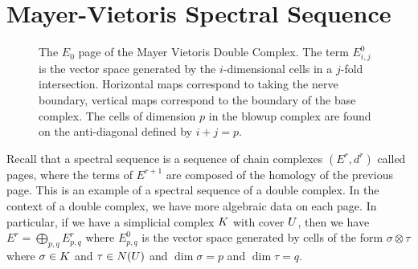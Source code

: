 \section{Mayer-Vietoris Spectral Sequence}
\begin{figure}[h]
\centering
{}
\caption{The $E_0$ page of the Mayer Vietoris Double Complex. The term $E^0_{i,j}$ is the vector space generated by the $i$-dimensional cells in a $j$-fold intersection. Horizontal maps correspond to taking the nerve boundary, vertical maps correspond to the boundary of the base complex. The cells of dimension $p$ in the blowup complex are found on the anti-diagonal defined by $i+j = p$.}
\end{figure}
Recall that a spectral sequence is a sequence of chain complexes $(E^r, d^r)$ called pages, where the terms of $E^{r+1}$ are composed of the homology of the previous page. This is an example of a spectral sequence of a double complex. In the context of a double complex, we have more algebraic data on each page. In particular, if we have a simplicial complex $K$ with cover $U$, then we have $E^r = \bigoplus_{p,q} E^r_{p,q}$ where $E^0_{p,q}$ is the vector space generated by cells of the form $\sigma \otimes \tau$ where $\sigma \in K$ and $\tau \in N(U)$ and $\dim{\sigma} = p$ and $\dim{\tau} = q$. 
